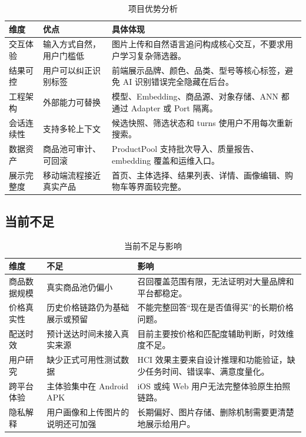 \documentclass[UTF8,a4paper,zihao=-4]{ctexart}
\begin{document}
\begin{table}[H]
\centering
\caption{项目优势分析}
\begin{tabularx}{\textwidth}{p{3.1cm}Y Y}
\toprule
维度 & 优点 & 具体体现 \\
\midrule
交互体验 & 输入方式自然，用户门槛低 & 图片上传和自然语言追问构成核心交互，不要求用户学习复杂筛选器。 \\
结果可控 & 用户可以纠正识别标签 & 前端展示品牌、颜色、品类、型号等核心标签，避免 AI 识别错误完全隐藏在后台。 \\
工程架构 & 外部能力可替换 & 模型、Embedding、商品源、对象存储、ANN 都通过 Adapter 或 Port 隔离。 \\
会话连续性 & 支持多轮上下文 & 候选快照、筛选状态和 turns 使用户不用每次重新搜索。 \\
数据资产 & 商品池可审计、可回滚 & ProductPool 支持批次导入、质量报告、embedding 覆盖和运维入口。 \\
展示完整度 & 移动端流程接近真实产品 & 首页、主体选择、结果列表、详情、画像编辑、购物车等界面较完整。 \\
\bottomrule
\end{tabularx}
\end{table}

\subsection{当前不足}

\begin{table}[H]
\centering
\caption{当前不足与影响}
\begin{tabularx}{\textwidth}{p{3.1cm}Y Y}
\toprule
维度 & 不足 & 影响 \\
\midrule
商品数据规模 & 真实商品池仍偏小 & 召回覆盖范围有限，无法证明对大量品牌和平台都稳定。 \\
价格真实性 & 历史价格链路仍为基础展示或预留 & 不能完整回答“现在是否值得买”的长期价格问题。 \\
配送时效 & 预计送达时间未接入真实来源 & 目前主要按价格和匹配度辅助判断，时效维度不足。 \\
用户研究 & 缺少正式可用性测试数据 & HCI 效果主要来自设计推理和功能验证，缺少任务时间、错误率、满意度量化。 \\
跨平台体验 & 主体验集中在 Android APK & iOS 或纯 Web 用户无法完整体验原生拍照链路。 \\
隐私解释 & 用户画像和上传图片的说明还可加强 & 长期偏好、图片存储、删除机制需要更清楚地展示给用户。 \\
\bottomrule
\end{tabularx}
\end{table}
\end{document}
